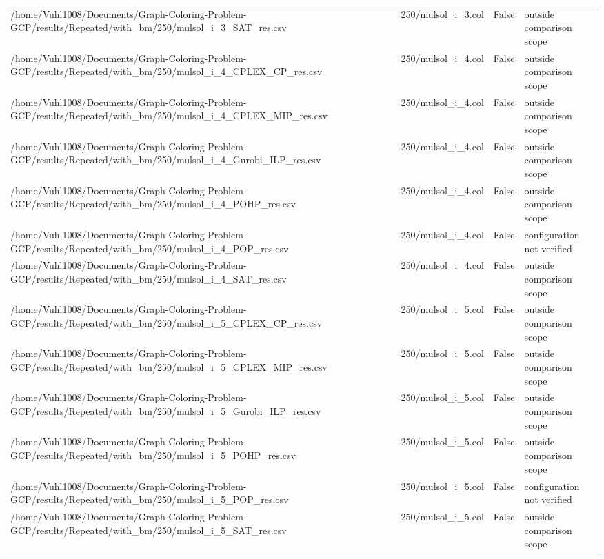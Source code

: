 \begin{table}[htbp]
\begin{tabular}{llll}
/home/Vuhl1008/Documents/Graph-Coloring-Problem-GCP/results/Repeated/with\_bm/250/mulsol\_i\_3\_SAT\_res.csv & 250/mulsol\_i\_3.col & False & outside comparison scope \\
/home/Vuhl1008/Documents/Graph-Coloring-Problem-GCP/results/Repeated/with\_bm/250/mulsol\_i\_4\_CPLEX\_CP\_res.csv & 250/mulsol\_i\_4.col & False & outside comparison scope \\
/home/Vuhl1008/Documents/Graph-Coloring-Problem-GCP/results/Repeated/with\_bm/250/mulsol\_i\_4\_CPLEX\_MIP\_res.csv & 250/mulsol\_i\_4.col & False & outside comparison scope \\
/home/Vuhl1008/Documents/Graph-Coloring-Problem-GCP/results/Repeated/with\_bm/250/mulsol\_i\_4\_Gurobi\_ILP\_res.csv & 250/mulsol\_i\_4.col & False & outside comparison scope \\
/home/Vuhl1008/Documents/Graph-Coloring-Problem-GCP/results/Repeated/with\_bm/250/mulsol\_i\_4\_POHP\_res.csv & 250/mulsol\_i\_4.col & False & outside comparison scope \\
/home/Vuhl1008/Documents/Graph-Coloring-Problem-GCP/results/Repeated/with\_bm/250/mulsol\_i\_4\_POP\_res.csv & 250/mulsol\_i\_4.col & False & configuration not verified \\
/home/Vuhl1008/Documents/Graph-Coloring-Problem-GCP/results/Repeated/with\_bm/250/mulsol\_i\_4\_SAT\_res.csv & 250/mulsol\_i\_4.col & False & outside comparison scope \\
/home/Vuhl1008/Documents/Graph-Coloring-Problem-GCP/results/Repeated/with\_bm/250/mulsol\_i\_5\_CPLEX\_CP\_res.csv & 250/mulsol\_i\_5.col & False & outside comparison scope \\
/home/Vuhl1008/Documents/Graph-Coloring-Problem-GCP/results/Repeated/with\_bm/250/mulsol\_i\_5\_CPLEX\_MIP\_res.csv & 250/mulsol\_i\_5.col & False & outside comparison scope \\
/home/Vuhl1008/Documents/Graph-Coloring-Problem-GCP/results/Repeated/with\_bm/250/mulsol\_i\_5\_Gurobi\_ILP\_res.csv & 250/mulsol\_i\_5.col & False & outside comparison scope \\
/home/Vuhl1008/Documents/Graph-Coloring-Problem-GCP/results/Repeated/with\_bm/250/mulsol\_i\_5\_POHP\_res.csv & 250/mulsol\_i\_5.col & False & outside comparison scope \\
/home/Vuhl1008/Documents/Graph-Coloring-Problem-GCP/results/Repeated/with\_bm/250/mulsol\_i\_5\_POP\_res.csv & 250/mulsol\_i\_5.col & False & configuration not verified \\
/home/Vuhl1008/Documents/Graph-Coloring-Problem-GCP/results/Repeated/with\_bm/250/mulsol\_i\_5\_SAT\_res.csv & 250/mulsol\_i\_5.col & False & outside comparison scope \\

\end{tabular}
\end{table}
